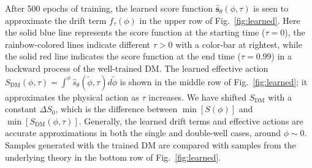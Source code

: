 After 500 epochs of training, the learned score function $\hat{\mathbf{s}}_\theta(\phi,\tau)$ is seen to approximate the drift term $f_\tau(\phi)$ in the upper row of Fig.~\ref{fig:learned}. 
Here the solid blue line represents the score function at the starting time ($\tau = 0$), 
the rainbow-colored lines indicate different $\tau > 0$ with a color-bar at rightest, while the solid red line indicates the score function at the end time ($\tau = 0.99$) in a backward process of the well-trained DM. 
The learned effective action $S_\text{DM}(\phi,\tau) = \int^{\phi}\hat{s}_\theta(\tilde{\phi},\tau) d\tilde{\phi} $ is shown in the middle row of Fig.~\ref{fig:learned}; it approximates the physical action as $\tau$ increases. We have shifted $S_\text{DM}$ with a constant $\Delta S_0$, which is the difference between $\min[S(\phi)]$ and $\min[S_\text{DM}(\phi,\tau)]$.  Generally, the learned drift terms and effective actions are accurate approximations in both the single and double-well cases, around $\phi\sim 0$. Samples generated with the trained DM are compared with samples from the underlying theory in the bottom row of Fig.~\ref{fig:learned}. 


